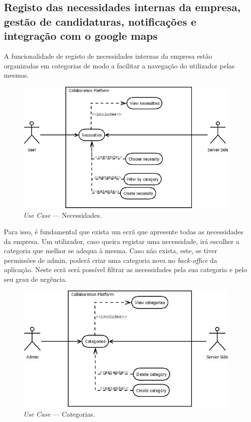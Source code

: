 \subsection{Registo das necessidades internas da empresa, gestão de candidaturas, notificações e integração com o google maps}\label{subsec:necessitiesCandidatesNotificationsGoogleMaps}

A funcionalidade de registo de necessidades internas da empresa estão organizadas em categorias de modo a facilitar a navegação do utilizador pelas mesmas.

\begin{figure}[H]
    \centering
    \includegraphics[scale=0.6]{figures/Necessities.jpeg}
    \caption{\textit{Use Case} --- Necessidades.}\label{fig:uc:necessities}
\end{figure}

Para isso, é fundamental que exista um ecrã que apresente todas as necessidades da empresa. 
Um utilizador, caso queira registar uma necessidade, irá escolher a categoria que melhor se adequa à mesma. 
Caso não exista, este, se tiver permissões de admin, poderá criar uma categoria nova no \textit{back-office} da aplicação. 
Neste ecrã será possível filtrar as necessidades pela sua categoria e pelo seu grau de urgência.

\begin{figure}[H]
    \centering
    \includegraphics[scale=0.6]{figures/Categories use case.jpeg}
    \caption{\textit{Use Case} --- Categorias.}\label{fig:uc:categories}
\end{figure}

